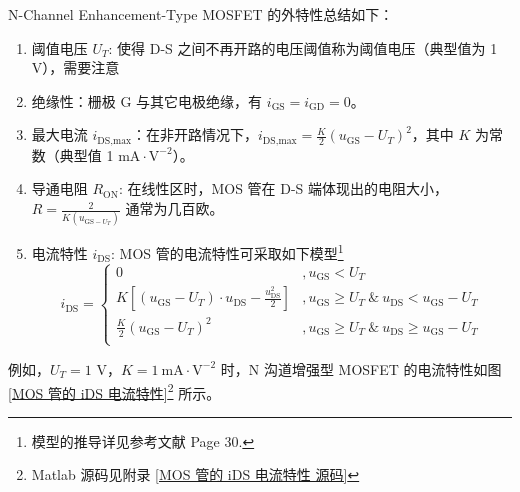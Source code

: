 \documentclass[UTF8]{report}
\theoremstyle{MyLineTheoremStyle} %
\theoremstyle{MyBlockTheoremStyle} %
\theoremstyle{MySubsubsectionStyle} %
\begin{document}
N-Channel Enhancement-Type MOSFET 的外特性总结如下：
\begin{enumerate}
\item 阈值电压 $U_T$: 使得 D-S 之间不再开路的电压阈值称为阈值电压（典型值为 1 V），需要注意 
\item 绝缘性：栅极 G 与其它电极绝缘，有 $i_{\text{GS}} = i_{\text{GD}} = 0$。
\item 最大电流 $i_{\text{DS},\text{max}}$：在非开路情况下，$i_{\text{DS},\text{max}} = \frac{K}{2}(u_{\text{GS}} - U_T)^2$，其中 $K$ 为常数（典型值 1 $\mathrm{mA\cdot V^{-2}}$）。
\item 导通电阻 $R_{\text{ON}}$: 在线性区时，MOS 管在 D-S 端体现出的电阻大小，$R = \frac{2}{K(u_{\text{GS} - U_T})}$ 通常为几百欧。
\item 电流特性 $i_{\text{DS}}$: MOS 管的电流特性可采取如下模型\footnote{模型的推导详见参考文献 \cite{电路原理导学导教} Page 30.}
\begin{equation}
i_{\text{DS}} = 
\begin{cases}
    0 &, u_{\text{GS}} < U_T \\
    K \left[ (u_{\text{GS}} - U_T)\cdot u_{\text{DS}} - \frac{u_{\text{DS}}^2}{2} \right] &, u_{\text{GS}} \geq U_T\ \& \ u_{\text{DS}} < u_{\text{GS}} - U_T \\ 
    \frac{K}{2}(u_{\text{GS}} - U_T)^2 &, u_{\text{GS}} \geq U_T\ \& \ u_{\text{DS}} \geqslant u_{\text{GS}} - U_T \\ 
\end{cases}
\end{equation}
\end{enumerate}




例如，$U_T = 1$ V，$K = 1\ \mathrm{mA \cdot V^{-2}}$ 时，N 沟道增强型 MOSFET 的电流特性如图 \ref{MOS 管的 iDS 电流特性}\footnote{Matlab 源码见附录 \ref{MOS 管的 iDS 电流特性 源码}} 所示。
\end{document}
